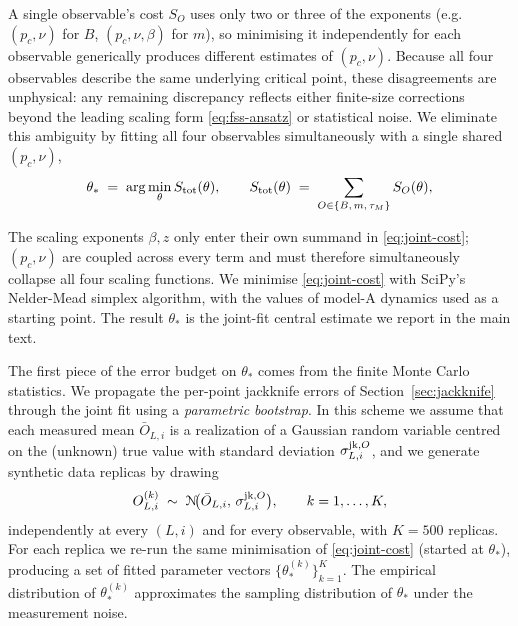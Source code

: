 \documentclass[pra,aps,twocolumn,groupedaddress,superscriptaddress,nofootinbib,preprintnumbers]{revtex4-2}
\begin{document}
\begin{widetext}
		A single observable's cost $S_O$ uses only two or three of the
		exponents (e.g.\ $(p_c,\nu)$ for $B$, $(p_c,\nu,\beta)$ for
		$m$), so minimising it independently for each
		observable generically produces different estimates of $(p_c,\nu)$. Because all four observables describe the same
		underlying critical point, these disagreements are unphysical: any
		remaining discrepancy reflects either finite-size corrections beyond
		the leading scaling form \eqref{eq:fss-ansatz} or statistical noise.
		We eliminate this ambiguity by fitting all four observables
		simultaneously with a single shared $(p_c,\nu)$,
		\begin{equation}
			\theta_* \;=\;
			\arg\min_{\theta} S_{\rm tot}(\theta),
			\qquad
			S_{\rm tot}(\theta)
			\;=\;
			\sum_{O \in \{B,\,m,\,\tau_M\}}
			S_O(\theta),
			\label{eq:joint-cost}
		\end{equation}
		
		The scaling exponents $\beta,z$ only enter their  own summand in
		\eqref{eq:joint-cost}; $(p_c,\nu)$ are coupled across every term and
		must therefore simultaneously collapse all four scaling functions. 
		We minimise \eqref{eq:joint-cost} with SciPy's Nelder-Mead simplex
		algorithm, with the values of model-A dynamics used as a starting point. The result $\theta_*$ is the
		joint-fit central estimate we report in the main text.
		
		\label{sec:bootstrap}
		
		The first piece of the error budget on $\theta_*$ comes from the
		finite Monte Carlo statistics. We propagate the per-point jackknife
		errors of Section~\ref{sec:jackknife} through the joint fit using a
		\emph{parametric bootstrap}. In this scheme we assume that each
		measured mean $\bar O_{L,i}$ is a realization of a Gaussian random
		variable centred on the (unknown) true value with standard deviation
		$\sigma_{L,i}^{{\rm jk},O}$, and we generate synthetic data replicas
		by drawing
		\begin{equation}
			O_{L,i}^{(k)} \;\sim\; \mathcal{N}\!\bigl(\bar O_{L,i},\,
			\sigma_{L,i}^{{\rm jk},O}\bigr),
			\qquad k = 1,\dots,K,
			\label{eq:param-boot-draw}
		\end{equation}
		independently at every $(L,i)$ and for every observable, with $K = 500$
		replicas. For each replica we re-run the same minimisation of
		\eqref{eq:joint-cost} (started at $\theta_*$), producing a
		set of fitted parameter vectors $\{\theta_*^{(k)}\}_{k=1}^K$. The
		empirical distribution of $\theta_*^{(k)}$ approximates the
		sampling distribution of $\theta_*$ under the measurement noise.
		

\end{widetext}
\end{document}
